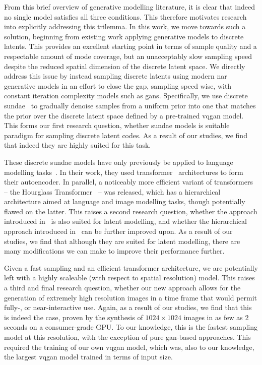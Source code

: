 From this brief overview of generative modelling literature, it is clear that
indeed no single model satisfies all three conditions. This therefore motivates
research into explicitly addressing this trilemma. In this work, we move towards
such a solution, beginning from existing work applying generative models to
discrete latents. This provides an excellent starting point in terms of sample
quality and a respectable amount of mode coverage, but an unacceptably slow
sampling speed despite the reduced spatial dimension of the discrete latent
space. We directly address this issue by instead sampling discrete latents using
modern \gls{nar} generative models in an effort to close the gap, sampling speed
wise, with constant iteration complexity models such as \glspl{gan}.
Specifically, we use discrete \gls{sundae}~\cite{savinov2022stepunrolled} to
gradually denoise samples from a uniform prior into one that matches the prior
over the discrete latent space defined by a pre-trained \gls{vqgan} model. This
forms our first research question, whether \gls{sundae} models is suitable
paradigm for sampling discrete latent codes. As a result of our studies, we find
that indeed they are highly suited for this task.

These discrete \gls{sundae} models have only previously be applied to
language modelling tasks~\cite{savinov2022stepunrolled}. In their work, they
used transformer~\cite{vaswani2017attention} architectures to form their
autoencoder. In parallel, a noticeably more efficient variant of transformers --
the Hourglass Transformer~\cite{nawrot2021hierarchical} -- was released, which
has a hierarchical architecture aimed at language and image modelling tasks,
though potentially flawed on the latter. This raises a second research question,
whether the approach introduced in~\citet{savinov2022stepunrolled} is also
suited for latent modelling, and whether the hierarchical approach introduced
in~\citet{nawrot2021hierarchical} can be further improved upon. As a result of
our studies, we find that although they are suited for latent modelling, there
are many modifications we can make to improve their performance further.

Given a fast sampling and an efficient transformer architecture, we are
potentially left with a highly scaleable (with respect to spatial resolution)
model. This raises a third and final research question, whether our new approach
allows for the generation of extremely high resolution images in a time frame
that would permit fully-, or near-interactive use. Again, as a result of our
studies, we find that this is indeed the case, proven by the synthesis of $1024
\times 1024$ images in as few as 2 seconds on a consumer-grade GPU. To our
knowledge, this is the fastest sampling model at this resolution, with the
exception of pure \gls{gan}-based approaches. This required the training of our
own \gls{vqgan} model, which was, also to our knowledge, the largest \gls{vqgan} model
trained in terms of input size.

